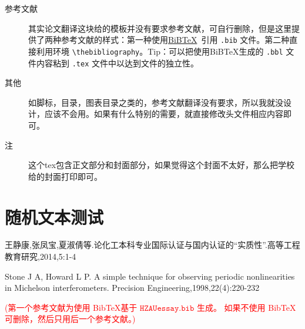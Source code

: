 \documentclass[a4paper]{article}
\newcommand{\song}{\CJKfamily{song}}
\newcommand{\kai}{\CJKfamily{kai}}
\newcommand{\xiaosihao}{\fontsize{12pt}{18pt}\selectfont}
\newcommand{\wuhao}{\fontsize{10.5pt}{18pt}\selectfont}
\newcommand\seccontent{
	\song
	\xiaosihao %
    \setlength{\parindent}{2em} %
    \setlength{\parskip}{0pt}
    }
\theoremstyle{definition}
\theoremstyle{plain}
\theoremstyle{remark}
\newcommand{\hongzifuzhu}[1]{\textcolor{red}{\kai \wuhao(#1)}}
\begin{document}
\begin{description}
	\item[参考文献] 其实论文翻译这块给的模板并没有要求参考文献，可自行删除，但是这里提供了两种参考文献的样式：第一种使用\href{http://www.bibtex.org/}{BiB\TeX}\ 引用 \verb|.bib| 文件。第二种直接利用环境 \verb*|\thebibliography|。Tip：可以把使用BiB\TeX 生成的 \verb*|.bbl| 文件内容粘到 \verb*|.tex| 文件中以达到文件的独立性。
	
	\item[其他] 如脚标，目录，图表目录之类的，参考文献翻译没有要求，所以我就没设计，应该不会用。如果有什么特别的需要，就直接修改头文件相应内容即可。
	
	\item[注] 这个tex包含正文部分和封面部分，如果觉得这个封面不太好，那么把学校给的封面打印即可。
\end{description}


\section{随机文本测试}
\blindtext[4]


\clearpage
{}
{}


\label{bibtexref}

\begin{thebibliography}{3}
	\label{latexref}
	\seccontent
	 王静康,张凤宝,夏淑倩等.论化工本科专业国际认证与国内认证的“实质性”.高等工程教育研究,2014,5:1-4
	
	 Stone J A, Howard L P. A simple technique for observing periodic nonlinearities in Michelson interferometers. Precision Engineering,1998,22(4):220-232
	
\end{thebibliography}

\hongzifuzhu{第一个参考文献为使用 Bib\TeX 基于 $ \mathtt{HZAUessay.bib} $ 生成。 如果不使用 Bib\TeX 可删除，然后只用后一个参考文献。}
\end{document}
